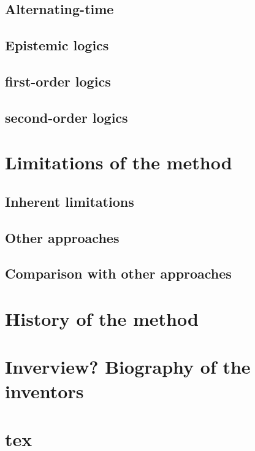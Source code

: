 \documentclass{book}
\begin{document}
\section{Alternating-time}

\section{Epistemic logics}

\section{first-order logics}

\section{second-order logics}




\chapter{Limitations of the method}

\section{Inherent limitations}

\section{Other approaches}

\section{Comparison with other approaches}


\chapter{History of the method}


\chapter{Inverview? Biography of the inventors}

\chapter{tex}


 
 






 \backmatter                    %
\end{document}
